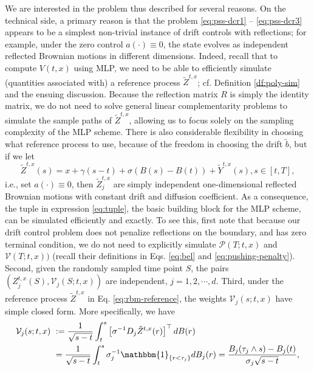\documentclass[11pt]{article}
\theoremstyle{definition}
\theoremstyle{plain}
\newcommand{\tb}{\tilde{b}}
\newcommand{\mbOne}{\mathbbm{1}}
\begin{document}
We are interested in the problem thus described for several reasons. 
On the technical side, a primary reason is that the problem \eqref{eq:pss-dcr1} -- \eqref{eq:pss-dcr3} appears to be 
a simplest non-trivial instance of drift controls with reflections; for example,  
under the zero control $a(\cdot) \equiv 0$, the state evolves as independent reflected Brownian motions in different dimensions. 
Indeed, recall that to compute $V(t,x)$ using MLP, we need to be able to efficiently simulate 
(quantities associated with) a reference process $\tilde Z^{t,x}$; cf. Definition \ref{df:poly-sim} and the ensuing discussion. 
Because the reflection matrix $R$ is simply the identity matrix, 
we do not need to solve general linear complementarity problems \cite{AtaHarrisonSi2024} to simulate the sample paths of $\tilde Z^{t,x}$,
allowing us to focus solely on the sampling complexity of the MLP scheme. 
There is also considerable flexibility in choosing what reference process to use, because of the freedom in choosing the drift $\tb$, 
but if we let 
\begin{equation}\label{eq:rbm-reference}
\tilde Z^{t,x}(s) = x + \gamma (s-t)  + \sigma \left(B(s)-B(t)\right) + \tilde Y^{t,x}(s), s \in [t, T], 
\end{equation}
i.e., set $a(\cdot) \equiv 0$, 
then $\tilde Z_j^{t,x}$ are simply independent one-dimensional reflected Brownian motions with constant drift and diffusion coefficient. 
As a consequence, the tuple in expression \eqref{eq:tuple}, the basic building block for the MLP scheme, can be simulated efficiently and exactly. 
To see this, first note that because 
our drift control problem does not penalize reflections on the boundary, and has zero terminal condition, 
we do not need to explicitly simulate $\mathcal{P}(T; t,x)$ and $\mathcal{V}(T; t,x))$
(recall their definitions in Eqs. \eqref{eq:bel} and \eqref{eq:pushing-penalty}). 
Second, given the randomly sampled time point $S$, the pairs $(Z^{t,x}_j(S), \mathcal{V}_j(S; t,x))$ are independent, $j = 1, 2, \cdots, d$. 
Third, under the reference process $\tilde Z^{t,x}$ in Eq. \eqref{eq:rbm-reference}, the weights $\mathcal{V}_j(s; t, x)$ have simple closed form. 
More specifically, we have
\begin{align}
\mathcal{V}_j(s; t, x) &~:= \frac{1}{\sqrt{s-t}} \int_t^s \left[\sigma^{-1} D_j\tilde{Z}^{t,x}(r)\right]^{\top} dB(r) \nonumber \\
&~= \frac{1}{\sqrt{s-t}} \int_t^s \sigma_j^{-1}\mbOne_{\{r < \tau_j\}} dB_j(r) = \frac{B_j(\tau_j\wedge s) - B_j(t)}{\sigma_j \sqrt{s-t}}, \label{eq:pss-mlp-V}
\end{align}
\end{document}
